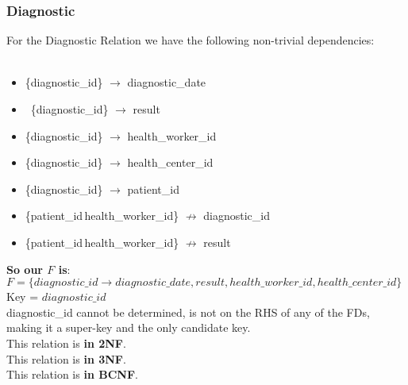 \subsubsection{Diagnostic}
For the Diagnostic Relation we have the following non-trivial dependencies:\\
\\
\begin{minipage}{\textwidth}
\begin{itemize}
    \item  \{diagnostic\_id\}   $\rightarrow$ diagnostic\_date
    \item\ \{diagnostic\_id\}   $\rightarrow$ result
    \item  \{diagnostic\_id\}   $\rightarrow$ health\_worker\_id
    \item  \{diagnostic\_id\}   $\rightarrow$ health\_center\_id\
    \item  \{diagnostic\_id\}   $\rightarrow$ patient\_id
    \item  \{patient\_id\,health\_worker\_id\} $\not \rightarrow$ diagnostic\_id
    \item  \{patient\_id\,health\_worker\_id\} $\not \rightarrow$ result
\end{itemize}
\end{minipage}

\begin{tcolorbox}
\textbf{So our $F$ is}:
$F = \{diagnostic\_id \rightarrow diagnostic\_date, result, health\_worker\_id, health\_center\_id\}$\\
Key = $diagnostic\_id$\\
diagnostic\_id cannot be determined, is not on the RHS of any of the FDs, making it a super-key and the only candidate key.\\
This relation is \textbf{in 2NF}.\\
This relation is \textbf{in 3NF}.\\
This relation is \textbf{in BCNF}.
\end{tcolorbox}


